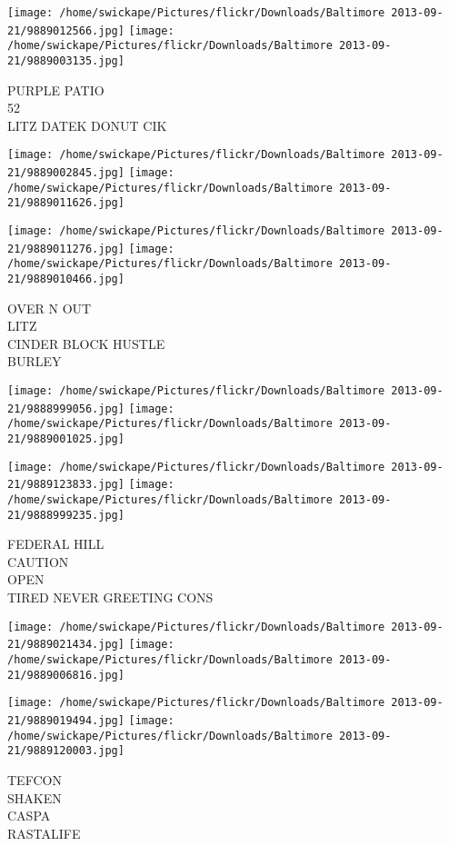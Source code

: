 \documentclass[10pt,letterpaper]{article}
\begin{document}
\vspace{0.25in}
\texttt{[image: /home/swickape/Pictures/flickr/Downloads/Baltimore 2013-09-21/9889012566.jpg]}
\texttt{[image: /home/swickape/Pictures/flickr/Downloads/Baltimore 2013-09-21/9889003135.jpg]}

PURPLE PATIO\\
52\\
LITZ DATEK DONUT CIK
\pagebreak

\texttt{[image: /home/swickape/Pictures/flickr/Downloads/Baltimore 2013-09-21/9889002845.jpg]}
\texttt{[image: /home/swickape/Pictures/flickr/Downloads/Baltimore 2013-09-21/9889011626.jpg]}

\texttt{[image: /home/swickape/Pictures/flickr/Downloads/Baltimore 2013-09-21/9889011276.jpg]}
\texttt{[image: /home/swickape/Pictures/flickr/Downloads/Baltimore 2013-09-21/9889010466.jpg]}

OVER N OUT\\
LITZ\\
CINDER BLOCK HUSTLE\\
BURLEY
\pagebreak

\texttt{[image: /home/swickape/Pictures/flickr/Downloads/Baltimore 2013-09-21/9888999056.jpg]}
\texttt{[image: /home/swickape/Pictures/flickr/Downloads/Baltimore 2013-09-21/9889001025.jpg]}

\texttt{[image: /home/swickape/Pictures/flickr/Downloads/Baltimore 2013-09-21/9889123833.jpg]}
\texttt{[image: /home/swickape/Pictures/flickr/Downloads/Baltimore 2013-09-21/9888999235.jpg]}

FEDERAL HILL\\
CAUTION\\
OPEN\\
TIRED NEVER GREETING CONS
\pagebreak

\texttt{[image: /home/swickape/Pictures/flickr/Downloads/Baltimore 2013-09-21/9889021434.jpg]}
\texttt{[image: /home/swickape/Pictures/flickr/Downloads/Baltimore 2013-09-21/9889006816.jpg]}

\texttt{[image: /home/swickape/Pictures/flickr/Downloads/Baltimore 2013-09-21/9889019494.jpg]}
\texttt{[image: /home/swickape/Pictures/flickr/Downloads/Baltimore 2013-09-21/9889120003.jpg]}

TEFCON\\
SHAKEN\\
CASPA\\
RASTALIFE
\pagebreak
\end{document}
